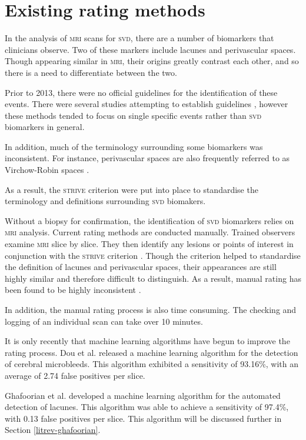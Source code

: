 \section{Existing rating methods}\label{svd-rating}

In the analysis of \textsc{mri} scans for \textsc{svd}, there are a number of biomarkers that clinicians observe. Two of these markers include lacunes and perivascular spaces. Though appearing similar in \textsc{mri}, their origins greatly contrast each other, and so there is a need to differentiate between the two.

Prior to 2013, there were no official guidelines for the identification of these events. There were several studies attempting to establish guidelines \cite{PotterGillian2015CPSV, AdamsH.H.Hieab2013RMfD}, however these methods tended to focus on single specific events rather than \textsc{svd} biomarkers in general.

In addition, much of the terminology surrounding some biomarkers was inconsistent. For instance, perivascular spaces are also frequently referred to as Virchow-Robin spaces \cite{AdamsH.H.Hieab2013RMfD, WardlawJ.M.2013Nsfr}.

As a result, the \textsc{strive} criterion \cite{WardlawJ.M.2013Nsfr} were put into place to standardise the terminology and definitions surrounding \textsc{svd} biomakers.

Without a biopsy for confirmation, the identification of \textsc{svd} biomarkers relies on \textsc{mri} analysis. Current rating methods are conducted manually. Trained observers examine \textsc{mri} slice by slice. They then identify any lesions or points of interest in conjunction with the \textsc{strive} criterion \cite{WardlawJ.M.2013Nsfr}. Though the criterion helped to standardise the definition of lacunes and perivascular spaces, their appearances are still highly similar and therefore difficult to distinguish. As a result, manual rating has been found to be highly inconsistent \cite{PotterGillian2015CPSV}. 

In addition, the manual rating process is also time consuming. The checking and logging of an individual scan can take over 10 minutes.

It is only recently that machine learning algorithms have begun to improve the rating process. Dou et al. \cite{DouQ.2016ADoC} released a machine learning algorithm for the detection of cerebral microbleeds. This algorithm exhibited a sensitivity of 93.16\%, with an average of 2.74 false positives per slice. 

Ghafoorian et al. \cite{GhafoorianM.2017Dml3} developed a machine learning algorithm for the automated detection of lacunes. This algorithm was able to achieve a sensitivity of 97.4\%, with 0.13 false positives per slice. This algorithm will be discussed further in Section \ref{litrev-ghafoorian}.


